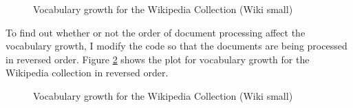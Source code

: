 \documentclass[letterpaper,11pt]{article}
\begin{document}
\begin{figure}[H]
	\centering
	\caption{Vocabulary growth for the Wikipedia Collection (Wiki small)}
	\label{fig:4_2_ascending}
\end{figure}

To find out whether or not the order of document processing affect the vocabulary growth, I modify the code so that the documents are being processed in reversed order. Figure \ref{fig:4_2_reverse} shows the plot for vocabulary growth for the Wikipedia collection in reversed order. 
\begin{figure}[H]
	\centering
	\caption{Vocabulary growth for the Wikipedia Collection (Wiki small)}
	\label{fig:4_2_reverse}
\end{figure}
\end{document}
